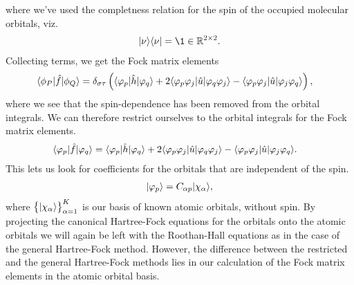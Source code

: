             where we've used the completness relation for the spin of the
            occupied molecular orbitals, viz.
            \begin{align}
                \ket{\nu}\bra{\nu}
                = \1 \in \mathbb{R}^{2 \times 2}.
            \end{align}
            Collecting terms, we get the Fock matrix elements
            \begin{align}
                \langle \phi_P |\hat{f}| \phi_Q \rangle
                &=
                \delta_{\sigma\tau}
                \left( 
                    \langle \varphi_p |\hat{h}| \varphi_q \rangle
                    +
                    2
                    \langle \varphi_p\varphi_j |\hat{u}| \varphi_q\varphi_j \rangle
                    -
                    \langle \varphi_p\varphi_j |\hat{u}| \varphi_j\varphi_q \rangle
                 \right),
            \end{align}
            where we see that the spin-dependence has been removed from the
            orbital integrals.
            We can therefore restrict ourselves to the orbital integrals for the
            Fock matrix elements.
            \begin{align}
                \langle \varphi_p |\hat{f}| \varphi_q \rangle
                &=
                \langle \varphi_p |\hat{h}| \varphi_q \rangle
                +
                2
                \langle \varphi_p\varphi_j |\hat{u}| \varphi_q\varphi_j \rangle
                -
                \langle \varphi_p\varphi_j |\hat{u}| \varphi_j\varphi_q \rangle.
            \end{align}
            This lets us look for coefficients for the orbitals that are
            independent of the spin.
            \begin{align}
                | \varphi_p \rangle = C_{\alpha p} | \chi_{\alpha} \rangle,
            \end{align}
            where $\left\{ | \chi_{\alpha} \rangle \right\}_{\alpha = 1}^{K}$ is our basis of
            known atomic orbitals, without spin.
            By projecting the canonical Hartree-Fock equations for the orbitals
            onto the atomic orbitals we will again be left with the Roothan-Hall
            equations as in the case of the general Hartree-Fock method.
            However, the difference between the restricted and the general
            Hartree-Fock methods lies in our calculation of the Fock matrix
            elements in the atomic orbital basis.
